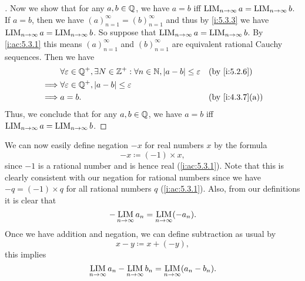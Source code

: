 \begin{proof}[]
  Now we show that for any \(a, b \in \mathbb{Q}\), we have \(a = b\) iff \(\operatorname*{LIM}_{n \to \infty} a = \operatorname*{LIM}_{n \to \infty} b\).
  If \(a = b\), then we have \((a)_{n = 1}^\infty = (b)_{n = 1}^\infty\) and thus by \cref{i:5.3.3} we have \(\operatorname*{LIM}_{n \to \infty} a = \operatorname*{LIM}_{n \to \infty} b\).
  So suppose that \(\operatorname*{LIM}_{n \to \infty} a = \operatorname*{LIM}_{n \to \infty} b\).
  By \cref{i:ac:5.3.1} this means \((a)_{n = 1}^\infty\) and \((b)_{n = 1}^\infty\) are equivalent rational Cauchy sequences.
  Then we have
  \begin{align*}
             & \forall \varepsilon \in \Q^+, \exists N \in \Z^+ : \forall n \in \N, \abs{a - b} \leq \varepsilon &  & \by{i:5.2.6}    \\
    \implies & \forall \varepsilon \in \Q^+, \abs{a - b} \leq \varepsilon                                                             \\
    \implies & a = b.                                                                                            &  & \by{i:4.3.7}[a]
  \end{align*}
  Thus, we conclude that for any \(a, b \in \mathbb{Q}\), we have \(a = b\) iff \(\operatorname*{LIM}_{n \to \infty} a = \operatorname*{LIM}_{n \to \infty} b\).
\end{proof}

\begin{ac}\label{i:ac:5.3.2}
  We can now easily define negation \(-x\) for real numbers \(x\) by the formula
  \[
    -x \coloneqq (-1) \times x,
  \]
  since \(-1\) is a rational number and is hence real (\cref{i:ac:5.3.1}).
  Note that this is clearly consistent with our negation for rational numbers since we have \(-q = (-1) \times q\) for all rational numbers \(q\) (\cref{i:ac:5.3.1}).
  Also, from our definitions it is clear that
  \[
    -\operatorname*{LIM}_{n \to \infty} a_n = \operatorname*{LIM}_{n \to \infty} (-a_n).
  \]
  Once we have addition and negation, we can define subtraction as usual by
  \[
    x - y \coloneqq x + (-y),
  \]
  this implies
  \[
    \operatorname*{LIM}_{n \to \infty} a_n - \operatorname*{LIM}_{n \to \infty} b_n = \operatorname*{LIM}_{n \to \infty} (a_n - b_n).
  \]
\end{ac}

